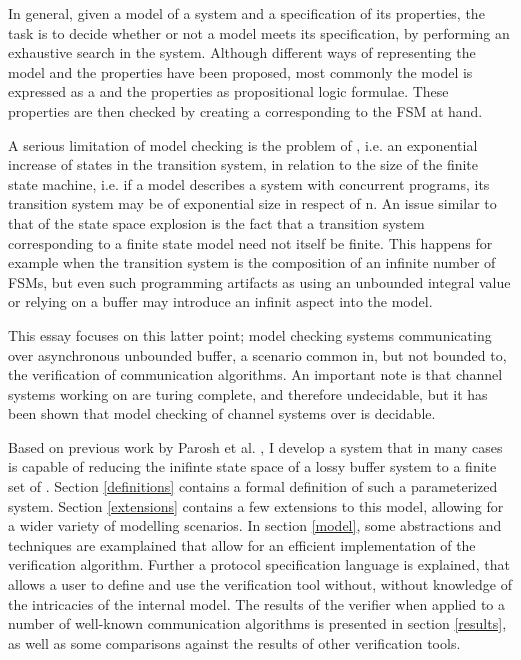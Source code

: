 In general, given a model of a system and a specification of its properties, the task is to decide whether or not a model meets its specification, by performing an exhaustive search in the system. Although different ways of representing the model and the properties have been proposed, most commonly the model is expressed as a  and the properties as propositional logic formulae. These properties are then checked by creating a  corresponding to the FSM at hand.

A serious limitation of model checking is the problem of , i.e. an exponential increase of states in the transition system, in relation to the size of the finite state machine, i.e. if a model describes a system with  concurrent programs, its transition system may be of exponential size in respect of n. An issue similar to that of the state space explosion is the fact that a transition system corresponding to a finite state model need not itself be finite. This happens for example when the transition system is the composition of an infinite number of FSMs, but even such programming artifacts as using an unbounded integral value or relying on a buffer may introduce an infinit aspect into the model.

This essay focuses on this latter point; model checking systems communicating over asynchronous unbounded buffer, a scenario common in, but not bounded to, the verification of communication algorithms. An important note is that channel systems working on  are turing complete, and therefore undecidable, but it has been shown that model checking of channel systems over  is decidable\cite{287591}\cite{Bertrand:2003:MCL:1754809.1754819}.

Based on previous work by Parosh et al. , I develop a system that in many cases is capable of reducing the inifinte state space of a lossy buffer system to a finite set of . Section \ref{definitions} contains a formal definition of such a parameterized system. Section \ref{extensions} contains a few extensions to this model, allowing for a wider variety of modelling scenarios. In section \ref{model}, some abstractions and techniques are examplained that allow for an efficient implementation of the verification algorithm. Further a protocol specification language is explained, that allows a user to define and use the verification tool without, without knowledge of the intricacies of the internal model. The results of the verifier when applied to a number of well-known communication algorithms is presented in section \ref{results}, as well as some comparisons against the results of other verification tools.

